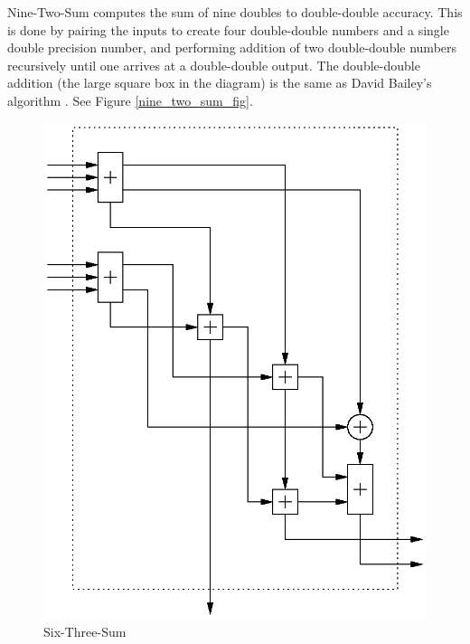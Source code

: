 \documentclass[11pt]{article}
\theoremstyle{definition}
\begin{document}
{\sc Nine-Two-Sum} computes the sum of nine doubles to double-double
accuracy.  This is done by pairing the inputs to create four double-double
numbers and a single double precision number, and performing
addition of two double-double numbers recursively until one arrives
at a double-double output.  The double-double addition (the large square
box in the diagram) is the same as David Bailey's algorithm \cite{bai-dd}.
See Figure \ref{nine_two_sum_fig}.

\begin{figure}
  \begin{center} 
    \includegraphics{six-three-sum.eps}
    \caption{\label{six_three_sum_fig}{\sc Six-Three-Sum}}
  \end{center}
\end{figure}
\end{document}
